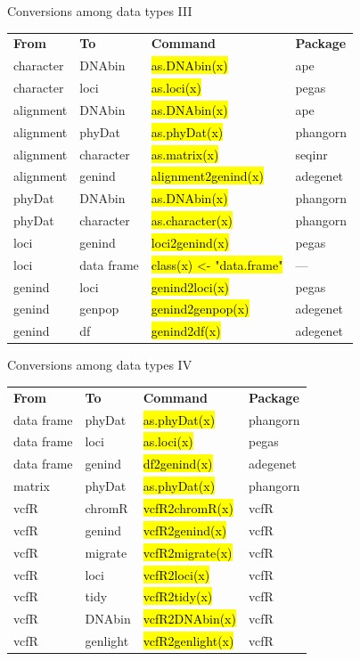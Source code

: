 \documentclass[compress, ucs, xelatex, 11pt, xcolor=svgnames,
	hyperref={
		bookmarks=true,
		unicode=true,
		colorlinks=true,
		pdftitle={Molecular data in R},
		plainpages=false,
		pdfauthor={Vojtech Zeisek},
		pdfsubject={Course about phylogeny and evolution in R},
		pdfcreator={XeLaTeX},
		pdfkeywords={R, evolution, phylogeny, molecular data},
		linkcolor=Tomato,
		anchorcolor=SaddleBrown,
		citecolor=Goldenrod,
		filecolor=DarkMagenta,
		menucolor=Sienna,
		urlcolor=DarkTurquoise,
		pdftex},
	url={hyphens, lowtilde} %
	]{beamer}
\renewcommand{\texttt}[1]{\hl{\ttfamily #1}}
\begin{document}
\begin{frame}{Conversions among data types III}
	\begin{tabular}{llll}
		\textbf{From} & \textbf{To} & \textbf{Command} & \textbf{Package}\\
		character & DNAbin & \texttt{as.DNAbin(x)} & ape\\
		character & loci & \texttt{as.loci(x)} & pegas\\
		alignment & DNAbin & \texttt{as.DNAbin(x)} & ape\\
		alignment & phyDat & \texttt{as.phyDat(x)} & phangorn\\
		alignment & character & \texttt{as.matrix(x)} & seqinr\\
		alignment & genind & \texttt{alignment2genind(x)} & adegenet\\
		phyDat & DNAbin & \texttt{as.DNAbin(x)} & phangorn\\
		phyDat & character & \texttt{as.character(x)} & phangorn\\
		loci & genind & \texttt{loci2genind(x)} & pegas\\
		loci & data frame & \texttt{class(x) <- "data.frame"} & --- \\
		genind & loci & \texttt{genind2loci(x)} & pegas\\
		genind & genpop & \texttt{genind2genpop(x)} & adegenet\\
		genind & df & \texttt{genind2df(x)} & adegenet
	\end{tabular}
\end{frame}

\begin{frame}{Conversions among data types IV}
	\begin{tabular}{llll}
		\textbf{From} & \textbf{To} & \textbf{Command} & \textbf{Package}\\
		data frame & phyDat & \texttt{as.phyDat(x)} & phangorn\\
		data frame & loci & \texttt{as.loci(x)} & pegas\\
		data frame & genind & \texttt{df2genind(x)} & adegenet\\
		matrix & phyDat & \texttt{as.phyDat(x)} & phangorn\\
		vcfR & chromR & \texttt{vcfR2chromR(x)} & vcfR\\
		vcfR & genind & \texttt{vcfR2genind(x)} & vcfR\\
		vcfR & migrate & \texttt{vcfR2migrate(x)} & vcfR\\
		vcfR & loci & \texttt{vcfR2loci(x)} & vcfR\\
		vcfR & tidy & \texttt{vcfR2tidy(x)} & vcfR\\
		vcfR & DNAbin & \texttt{vcfR2DNAbin(x)} & vcfR\\
		vcfR & genlight & \texttt{vcfR2genlight(x)} & vcfR
	\end{tabular}
\end{frame}
\end{document}
